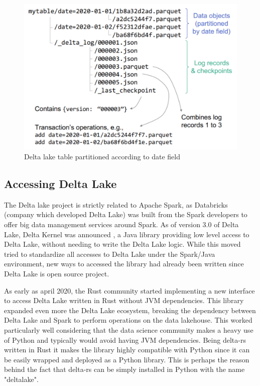 \begin{figure}
    \begin{center}
      \includegraphics[width=\textwidth]{figures/2-background/delta_lake_table.png}
    \end{center}
    \caption{Delta lake table partitioned according to date field}
    \label{fig:delta_table}
\end{figure}

\subsection{Accessing Delta Lake}
\label{subsec:delta_lake_access}

The Delta lake project is strictly related to Apache Spark, as Databricks (company which developed Delta Lake) was built from the Spark developers \cite{zaharia2010spark} to offer big data management services around Spark. As of version 3.0 of Delta Lake, Delta Kernel was announced \cite{AnnouncingDeltaLake2023}, a Java library providing low level access to Delta Lake, without needing to write the Delta Lake logic. While this moved tried to standardize all accesses to Delta Lake under the Spark/Java environment, new ways to accessed the library had already been written since Delta Lake is open source project.

As early as april 2020, the Rust community started implementing a new interface to access Delta Lake written in Rust without \gls{JVM} dependencies. This library expanded even more the Delta Lake ecosystem, breaking the dependency between Delta Lake and Spark to perform operations on the data lakehouse. This worked particularly well considering that the data science community makes a heavy use of Python and typically would avoid having \gls{JVM} dependencies. Being delta-rs written in Rust it makes the library highly compatible with Python since it can be easily wrapped and deployed as a Python library. This is perhaps the reason behind the fact that delta-rs can be simply installed in Python with the name "deltalake".